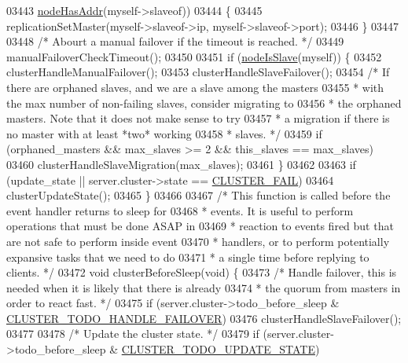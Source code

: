 \begin{DoxyCode}
{{{{{{{{{{{{{{{{{{{{{{{{{{{{{{{{{{{{{{{{{{{{{{{{{{{{{{{{{{{{{03443         \hyperlink{cluster_8h_ad1197dcefeb1bdf0cf163aacd971fbff}{nodeHasAddr}(myself->slaveof))
03444     \{
03445         replicationSetMaster(myself->slaveof->ip, myself->slaveof->port);
03446     \}
03447 
03448     \textcolor{comment}{/* Abourt a manual failover if the timeout is reached. */}
03449     manualFailoverCheckTimeout();
03450 
03451     \textcolor{keywordflow}{if} (\hyperlink{cluster_8h_a3c99881f6892130c902b42b1f84a0e11}{nodeIsSlave}(myself)) \{
03452         clusterHandleManualFailover();
03453         clusterHandleSlaveFailover();
03454         \textcolor{comment}{/* If there are orphaned slaves, and we are a slave among the masters}
03455 \textcolor{comment}{         * with the max number of non-failing slaves, consider migrating to}
03456 \textcolor{comment}{         * the orphaned masters. Note that it does not make sense to try}
03457 \textcolor{comment}{         * a migration if there is no master with at least *two* working}
03458 \textcolor{comment}{         * slaves. */}
03459         \textcolor{keywordflow}{if} (orphaned\_masters && max\_slaves >= 2 && this\_slaves == max\_slaves)
03460             clusterHandleSlaveMigration(max\_slaves);
03461     \}
03462 
03463     \textcolor{keywordflow}{if} (update\_state || server.cluster->state == \hyperlink{cluster_8h_a4a46e6d5b85c594d08283dc6da2a32bf}{CLUSTER\_FAIL})
03464         clusterUpdateState();
03465 \}
03466 
03467 \textcolor{comment}{/* This function is called before the event handler returns to sleep for}
03468 \textcolor{comment}{ * events. It is useful to perform operations that must be done ASAP in}
03469 \textcolor{comment}{ * reaction to events fired but that are not safe to perform inside event}
03470 \textcolor{comment}{ * handlers, or to perform potentially expansive tasks that we need to do}
03471 \textcolor{comment}{ * a single time before replying to clients. */}
03472 \textcolor{keywordtype}{void} clusterBeforeSleep(\textcolor{keywordtype}{void}) \{
03473     \textcolor{comment}{/* Handle failover, this is needed when it is likely that there is already}
03474 \textcolor{comment}{     * the quorum from masters in order to react fast. */}
03475     \textcolor{keywordflow}{if} (server.cluster->todo\_before\_sleep & \hyperlink{cluster_8h_afb969dfe84cf59e2340ed10cbf334a47}{CLUSTER\_TODO\_HANDLE\_FAILOVER})
03476         clusterHandleSlaveFailover();
03477 
03478     \textcolor{comment}{/* Update the cluster state. */}
03479     \textcolor{keywordflow}{if} (server.cluster->todo\_before\_sleep & \hyperlink{cluster_8h_abea0d393cba342261e4a7e6fb745f388}{CLUSTER\_TODO\_UPDATE\_STATE})
}}}}}}}}}}}}}}}}}}}}}}}}}}}}}}}}}}}}}}}}}}}}}}}}}}}}}}}}}}}}}
\end{DoxyCode}
